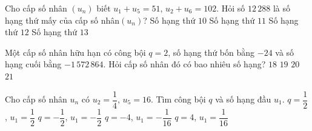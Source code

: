 \begin{ex}%
	Cho cấp số nhân $(u_n)$ biết $u_1+u_5=51,\,u_2+u_6=102$. Hỏi số $12\,288$ là số hạng thứ mấy của cấp số nhân$(u_n)$? 
	 \choice
		 {Số hạng thứ $10$}
		{Số hạng  thứ $11$}
		 {Số hạng thứ $12$}
		{\True Số hạng thứ $13$} 
\end{ex}

\begin{ex}%
	Một cấp số nhân hữu hạn có công bội $q=2$, số hạng thứ bốn bằng $-24$ và số hạng cuối bằng $-1\,572\,864$. Hỏi cấp số nhân đó có bao nhiêu số  hạng?
	 \choice
		 {$18$}
		{$19$} 
		 {\True $20$}
		{$21$} 
\end{ex}

\begin{ex}%
	Cho cấp số nhân $u_n$ có $u_2=\dfrac{1}{4}$,  $u_5=16$. Tìm công bội $q$ và số hạng đầu $u_1$.
	\choice 
		{$q=\dfrac{1}{2}$, $u_1=\dfrac{1}{2}$} 
		{$q=-\dfrac{1}{2}$,  $u_1=-\dfrac{1}{2}$}
		{$q=-4$,  $u_1=-\dfrac{1}{16}$}
		{\True $q=4$,  $u_1=\dfrac{1}{16}$}
\end{ex}

